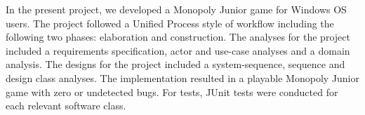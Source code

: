 \begin{flushleft} %

\doublespacing

In the present project, we developed a Monopoly Junior game for Windows OS users. The project followed a Unified Process style of workflow including the following two phases: elaboration and construction. The analyses for the project included a requirements specification, actor and use-case analyses and a domain analysis. The designs for the project included a system-sequence, sequence and design class analyses. The implementation resulted in a playable Monopoly Junior game with zero or undetected bugs. For tests, JUnit tests were conducted for each relevant software class. 

\end{flushleft}
